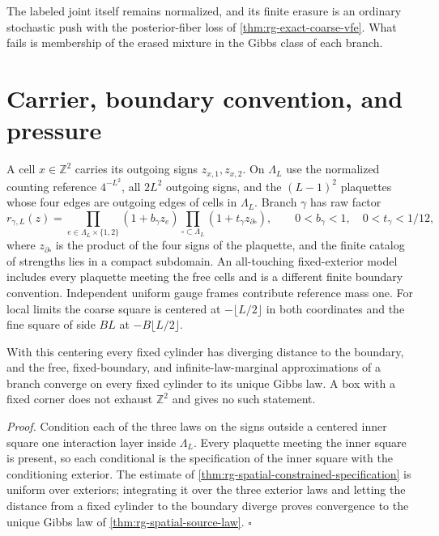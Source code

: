 The labeled joint itself remains normalized, and its finite erasure is an
ordinary stochastic push with the posterior-fiber loss of
\cref{thm:rg-exact-coarse-vfe}. What fails is membership of the erased
mixture in the Gibbs class of each branch.

\section{Carrier, boundary convention, and pressure}
\label{sec:rg-pressure-carrier}

A cell $x\in\mathbb Z^2$ carries its outgoing signs $z_{x,1},z_{x,2}$. On
$\Lambda_L$ use the normalized counting reference $4^{-L^2}$, all $2L^2$
outgoing signs, and the $(L-1)^2$ plaquettes whose four edges are outgoing
edges of cells in $\Lambda_L$. Branch $\gamma$ has raw factor
\begin{equation}
 r_{\gamma,L}(z)=\prod_{e\in\Lambda_L\times\{1,2\}}(1+b_\gamma z_e)
 \prod_{\square\subset\Lambda_L}(1+t_\gamma z_{\partial\square}),
 \qquad 0<b_\gamma<1,\quad 0<t_\gamma<1/12,
 \label{eq:rg-pressure-native-factor}
\end{equation}
where $z_{\partial\square}$ is the product of the four signs of the
plaquette, and the finite catalog of strengths lies in a compact subdomain.
An all-touching fixed-exterior model includes every plaquette meeting the
free cells and is a different finite boundary convention. Independent
uniform gauge frames contribute reference mass one. For local limits the
coarse square is centered at $-\lfloor L/2\rfloor$ in both coordinates and
the fine square of side $BL$ at $-B\lfloor L/2\rfloor$.

With this centering every fixed cylinder has diverging distance to the
boundary, and the free, fixed-boundary, and infinite-law-marginal
approximations of a branch converge on every fixed cylinder to its unique
Gibbs law. A box with a fixed corner does not exhaust $\mathbb Z^2$ and gives
no such statement. 

\noindent\emph{Proof.}
Condition each of the three laws on the signs outside a centered inner square
one interaction layer inside $\Lambda_L$. Every plaquette meeting the inner
square is present, so each conditional is the specification of the inner
square with the conditioning exterior. The estimate of
\cref{thm:rg-spatial-constrained-specification} is uniform over exteriors;
integrating it over the three exterior laws and letting the distance from a
fixed cylinder to the boundary diverge proves convergence to the unique
Gibbs law of \cref{thm:rg-spatial-source-law}. $\square$

